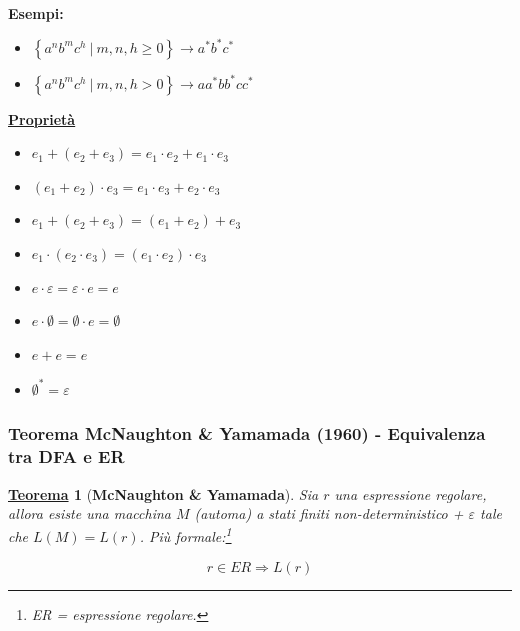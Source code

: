 \documentclass[a4paper]{article}
\newtheorem{theorem}{\textcolor{Red3}{\underline{Teorema}}}
\begin{document}
	\noindent
	\textcolor{Green4}{\textbf{Esempi:}}
	
	\begin{itemize}[label=-]
		\item $\left\{a^{n} b^{m} c^{h} \: \left| \: m,n,h \ge 0 \right.\right\} \longrightarrow a^{*} b^{*} c^{*}$
		
		\item $\left\{a^{n} b^{m} c^{h} \: \left| \: m,n,h > 0 \right.\right\} \longrightarrow aa^{*} bb^{*} cc^{*}$
	\end{itemize}

	\noindent
	\textcolor{Red3}{\textbf{\underline{Proprietà}}}
	
	\begin{itemize}[label=]
		\item $e_{1} + \left(e_{2} + e_{3}\right) = e_{1}\cdot e_{2} + e_{1} \cdot e_{3}$
		
		\item $\left(e_{1} + e_{2}\right) \cdot e_{3} = e_{1} \cdot e_{3} + e_{2} \cdot e_{3}$
		
		\item $e_{1} + \left(e_{2} + e_{3}\right) = \left(e_{1} + e_{2}\right) + e_{3}$
		
		\item $e_{1} \cdot \left(e_{2} \cdot e_{3}\right) = \left(e_{1} \cdot e_{2}\right) \cdot e_{3}$
		
		\item $e \cdot \varepsilon = \varepsilon \cdot e = e$
		
		\item $e \cdot \emptyset = \emptyset \cdot e = \emptyset$
		
		\item $e + e = e$
		
		\item $\emptyset^{*} = \varepsilon$
	\end{itemize}

	\newpage
	
	\subsubsection{Teorema McNaughton \& Yamamada (1960) - Equivalenza tra DFA e ER}

	\begin{theorem}[\textbf{McNaughton \& Yamamada}]
		Sia $r$ una espressione regolare, allora esiste una macchina $M$ (automa) a stati finiti non-deterministico + $\varepsilon$ tale che $L\left(M\right) = L\left(r\right)$. Più formale:\footnote{ER = espressione regolare.}
		
		\begin{equation*}
			r \in ER \Longrightarrow L\left(r\right)
		\end{equation*}
	\end{theorem}
	
\end{document}
